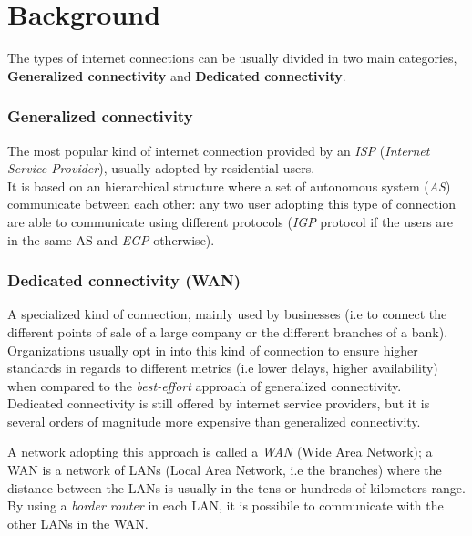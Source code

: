 \section{Background}

The types of internet connections can be usually divided in two main categories, \textbf{Generalized connectivity} and \textbf{Dedicated connectivity}.



\subsubsection{Generalized connectivity}

The most popular kind of internet connection provided by an \textit{ISP} (\textit{Internet Service Provider}), usually adopted by residential users. \\
It is based on an hierarchical structure where a set of autonomous system (\textit{AS}) communicate between each other: any two user adopting this type of connection are able to communicate using different protocols (\textit{IGP} protocol if the users are in the same AS and  \textit{EGP} otherwise).

\subsubsection{Dedicated connectivity (WAN)} \label{wans}

A specialized kind of connection, mainly used by businesses (i.e to connect the different points of sale of a large company or the different branches of a bank). \\

Organizations usually opt in into this kind of connection to ensure  higher standards in regards to different metrics (i.e lower delays, higher availability) when compared to the \textit{best-effort} approach of generalized connectivity. \\

Dedicated connectivity is still offered by internet service providers, but it is several orders of magnitude more expensive than generalized connectivity.

A network adopting this approach is called a \textit{WAN} (Wide Area Network);
a WAN is a network of LANs (Local Area Network, i.e the branches) where the distance between the LANs is usually in the tens or hundreds of kilometers range. \\
By using a \textit{border router} in each LAN, it is possibile to communicate with the other LANs in the WAN.

